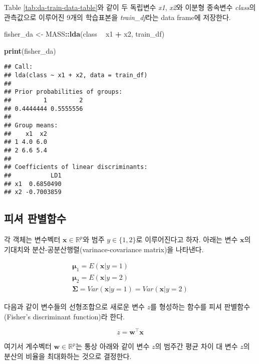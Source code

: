 \documentclass[]{book}
\newenvironment{Shaded}{\begin{snugshade}}{\end{snugshade}}
\newcommand{\KeywordTok}[1]{\textcolor[rgb]{0.13,0.29,0.53}{\textbf{#1}}}
\newcommand{\NormalTok}[1]{#1}
\newcommand{\OperatorTok}[1]{\textcolor[rgb]{0.81,0.36,0.00}{\textbf{#1}}}
\newcommand{\StringTok}[1]{\textcolor[rgb]{0.31,0.60,0.02}{#1}}
\begin{document}
Table \ref{tab:da-train-data-table}와 같이 두 독립변수 \emph{x1}, \emph{x2}와 이분형 종속변수 \emph{class}의 관측값으로 이루어진 9개의 학습표본을 \emph{train\_df}라는 data frame에 저장한다.

\begin{Shaded}
\begin{Highlighting}[]
\NormalTok{fisher_da <-}\StringTok{ }\NormalTok{MASS}\OperatorTok{::}\KeywordTok{lda}\NormalTok{(class }\OperatorTok{~}\StringTok{ }\NormalTok{x1 }\OperatorTok{+}\StringTok{ }\NormalTok{x2, train_df)}

\KeywordTok{print}\NormalTok{(fisher_da)}
\end{Highlighting}
\end{Shaded}

\begin{verbatim}
## Call:
## lda(class ~ x1 + x2, data = train_df)
## 
## Prior probabilities of groups:
##         1         2 
## 0.4444444 0.5555556 
## 
## Group means:
##    x1  x2
## 1 4.0 6.0
## 2 6.6 5.4
## 
## Coefficients of linear discriminants:
##           LD1
## x1  0.6850490
## x2 -0.7003859
\end{verbatim}

\hypertarget{-}{%
\subsection{피셔 판별함수}\label{-}}

각 객체는 변수벡터 \(\mathbf{x} \in \mathbb{R}^p\)와 범주 \(y \in \{1, 2\}\)로 이루어진다고 하자. 아래는 변수 \(\mathbf{x}\)의 기대치와 분산-공분산행렬(varinace-covariance matrix)을 나타낸다.

\begin{eqnarray*}
\boldsymbol\mu_1 = E(\mathbf{x} | y = 1)\\
\boldsymbol\mu_2 = E(\mathbf{x} | y = 2)\\
\boldsymbol\Sigma = Var(\mathbf{x} | y = 1) = Var(\mathbf{x} | y = 2)
\end{eqnarray*}

다음과 같이 변수들의 선형조합으로 새로운 변수 \(z\)를 형성하는 함수를 피셔 판별함수(Fisher's discriminant function)라 한다.

\begin{equation}
z = \mathbf{w}^\top \mathbf{x} \label{eq:fisher-discriminant-function}
\end{equation}

여기서 계수벡터 \(\mathbf{w} \in \mathbb{R}^p\)는 통상 아래와 같이 변수 \(z\)의 범주간 평균 차이 대 변수 \(z\)의 분산의 비율을 최대화하는 것으로 결정한다.
\end{document}
